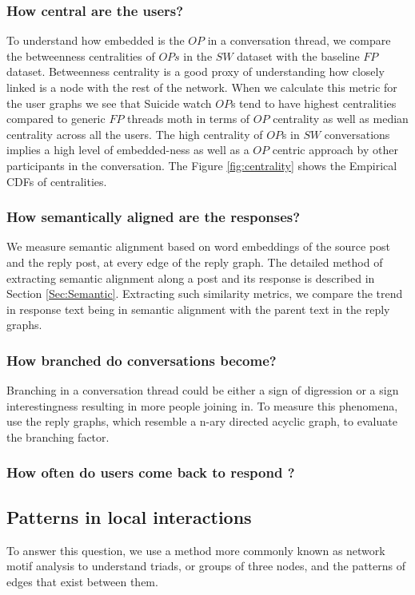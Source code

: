 \subsubsection{How central are the users?}
To understand how embedded is the $OP$ in a conversation thread, we compare the betweenness centralities of $OPs$ in the $SW$ dataset with the baseline $FP$ dataset. 
Betweenness centrality is a good proxy of understanding how closely linked is a node with the rest of the network. When we calculate this metric for the user graphs we see that Suicide watch $OP$s tend to have highest centralities compared to generic $FP$ threads moth in terms of $OP$ centrality as well as median centrality across all the users. The high centrality of $OP$s in $SW$ conversations implies a high level of embedded-ness as well as a $OP$ centric approach by other participants in the conversation. The Figure \ref{fig:centrality} shows the Empirical CDFs of centralities. 

\subsubsection{How semantically aligned are the responses?}
We measure semantic alignment based on word embeddings of the source post and the reply post, at every edge of the reply graph. The detailed method of extracting semantic alignment along a post and its response is described in Section \ref{Sec:Semantic}. Extracting such similarity metrics, we compare the trend in response text being in semantic alignment with the parent text in the reply graphs. 


\subsubsection{How branched do conversations become?}
Branching in a conversation thread could be either a sign of digression or a sign interestingness resulting in more people joining in. To measure this phenomena, use the reply graphs, which resemble a n-ary directed acyclic graph, to evaluate the branching factor. 

\subsubsection{How often do users come back to respond ? }



\subsection{Patterns in local interactions}
To answer this question, we use a method more commonly known as network motif analysis to understand triads, or groups of three nodes, and the patterns of edges that exist between them. 

